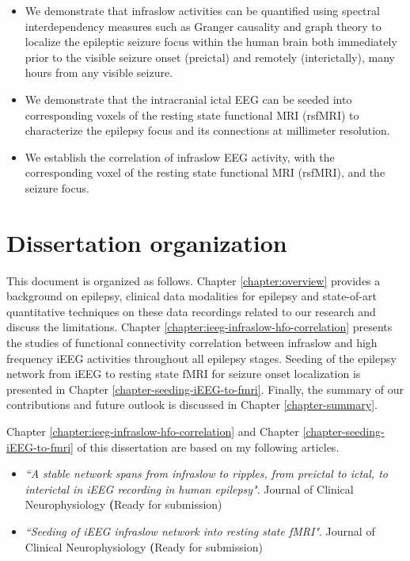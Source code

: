 \begin{itemize}
\item We demonstrate that infraslow activities can be quantified using spectral interdependency measures such as Granger causality and graph theory to localize the epileptic seizure focus within the human brain both immediately prior to the visible seizure onset (preictal) and remotely (interictally), many hours from any visible seizure. 

\item We demonstrate that the intracranial ictal EEG can be seeded into corresponding voxels of the resting state functional MRI (rsfMRI) to characterize the epilepsy focus and its connections at millimeter resolution. 

\item We establish the correlation of infraslow EEG activity, with the corresponding voxel of the resting state functional MRI (rsfMRI), and the seizure focus. 

\end{itemize}


\section{Dissertation organization}
This document is organized as follows. Chapter \ref{chapter:overview} provides a background on epilepsy, clinical data modalities for epilepsy and state-of-art quantitative techniques on these data recordings related to our research and discuss the limitations. 
Chapter \ref{chapter:ieeg-infraslow-hfo-correlation} presents the studies of functional connectivity correlation between infraslow and high frequency iEEG activities throughout all epilepsy stages. Seeding of the epilepsy network from iEEG to resting state fMRI for seizure onset localization is presented in Chapter \ref{chapter-seeding-iEEG-to-fmri}. Finally, the summary of our contributions and future outlook is discussed in Chapter \ref{chapter-summary}. 

Chapter \ref{chapter:ieeg-infraslow-hfo-correlation} and Chapter \ref{chapter-seeding-iEEG-to-fmri}  of this dissertation are based on my following articles.

\begin{itemize}

\item %
\textit{``A stable network spans from infraslow to ripples, from preictal to ictal, to interictal in iEEG recording in human epilepsy"}. Journal of Clinical Neurophysiology \textbf (Ready for submission)

\item \textit{``Seeding of iEEG infraslow network into resting state fMRI"}. Journal of Clinical Neurophysiology \textbf (Ready for submission)

\end{itemize}